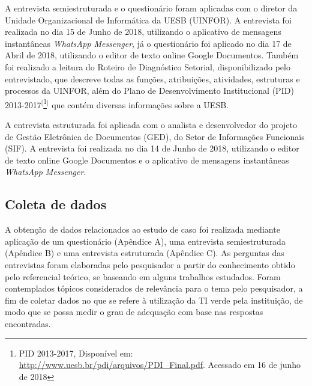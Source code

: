 A entrevista semiestruturada e o questionário foram aplicadas com o diretor da Unidade Organizacional de Informática da UESB (UINFOR). A entrevista foi realizada no dia 15 de Junho de 2018, utilizando o aplicativo de mensagens instantâneas \textit{WhatsApp Messenger}, já o questionário foi aplicado no dia 17 de Abril de 2018, utilizando o editor de texto online Google Documentos. Também foi realizado a leitura do Roteiro de Diagnóstico Setorial, disponibilizado pelo entrevistado, que descreve todas as funções, atribuições, atividades, estruturas e processos da UINFOR, além do Plano de Desenvolvimento Institucional (PID) 2013-2017$^{[}$\footnote{PID 2013-2017, Disponível em: \url{http://www.uesb.br/pdi/arquivos/PDI_Final.pdf}.  Acessado em 16 de junho de 2018}$^{]}$ que contém diversas informações sobre a UESB.

A entrevista estruturada foi aplicada com o analista e desenvolvedor do projeto de Gestão Eletrônica de Documentos (GED), do Setor de Informações Funcionais (SIF). A entrevista foi realizada no dia 14 de Junho de 2018, utilizando o editor de texto online Google Documentos e o aplicativo de mensagens instantâneas \textit{WhatsApp Messenger}.

\subsection{Coleta de dados}
A obtenção de dados relacionados ao estudo de caso foi realizada mediante aplicação de um questionário (Apêndice A), uma entrevista semiestruturada (Apêndice B) e uma entrevista estruturada (Apêndice C). As perguntas das entrevistas foram elaboradas pelo pesquisador a partir do conhecimento obtido pelo referencial teórico, se baseando em alguns trabalhos estudados. Foram contemplados tópicos considerados de relevância para o tema pelo pesquisador, a fim de coletar dados no que se refere à utilização da TI verde pela instituição, de modo que se possa medir o grau de adequação com base nas respostas encontradas.

